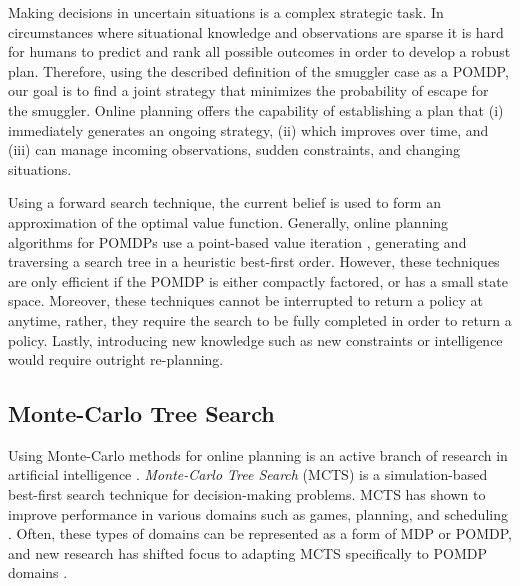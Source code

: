 \documentclass[conference]{IEEEtran}
\begin{document}
Making decisions in uncertain situations is a complex strategic task. In circumstances where situational knowledge and observations are sparse it is hard for humans to predict and rank all possible outcomes in order to develop a robust plan. Therefore, using the described definition of the smuggler case as a POMDP, our goal is to find a joint strategy that minimizes the probability of escape for the smuggler. Online planning offers the capability of establishing a plan that (i) immediately generates an ongoing strategy, (ii) which improves over time, and (iii) can manage incoming observations, sudden constraints, and changing situations. 

Using a forward search technique, the current belief is used to form an approximation of the optimal value function. Generally, online planning algorithms for POMDPs use a point-based value iteration \cite{pineau2006anytime,ross2008online}, generating and traversing a search tree in a heuristic best-first order. However, these techniques are only efficient if the POMDP is either compactly factored, or has a small state space. Moreover, these techniques cannot be interrupted to return a policy at anytime, rather, they require the search to be fully completed in order to return a policy. Lastly, introducing new knowledge such as new constraints or intelligence would require outright re-planning.

\subsection{Monte-Carlo Tree Search}
\label{sub:mcts}

Using Monte-Carlo methods for online planning is an active branch of research in artificial intelligence \cf \cite{browne2012survey}. {\it Monte-Carlo Tree Search} (MCTS) \cite{coulom2007efficient,kocsis2006bandit} is a simulation-based best-first search technique for decision-making problems. MCTS has shown to improve performance in various domains such as games, planning, and scheduling \cite{browne2012survey}. Often, these types of domains can be represented as a form of MDP or POMDP, and new research has shifted focus to adapting MCTS specifically to POMDP domains \cite{silver2010monte,Feldman12BRUE}. 
\end{document}
